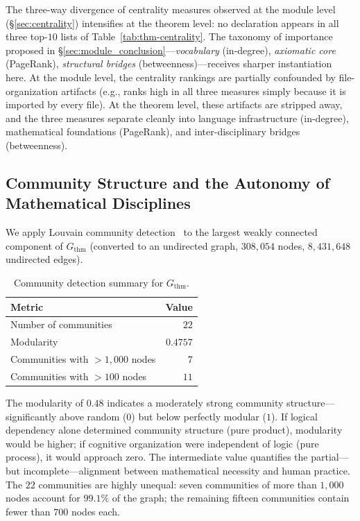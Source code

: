 \begin{remark}
\label{rem:thm-centrality-vs-module}
The three-way divergence of centrality measures observed at the module level (\S\ref{sec:centrality}) intensifies at the theorem level: no declaration appears in all three top-$10$ lists of Table~\ref{tab:thm-centrality}. The taxonomy of importance proposed in \S\ref{sec:module_conclusion}---\emph{vocabulary} (in-degree), \emph{axiomatic core} (PageRank), \emph{structural bridges} (betweenness)---receives sharper instantiation here. At the module level, the centrality rankings are partially confounded by file-organization artifacts (e.g.,  ranks high in all three measures simply because it is imported by every file). At the theorem level, these artifacts are stripped away, and the three measures separate cleanly into language infrastructure (in-degree), mathematical foundations (PageRank), and inter-disciplinary bridges (betweenness).
\end{remark}

\subsection{Community Structure and the Autonomy of Mathematical Disciplines}
\label{sec:thm-community}

We apply Louvain community detection~\cite{blondel2008} to the largest weakly connected component of $G_{\mathrm{thm}}$ (converted to an undirected graph, $308{,}054$ nodes, $8{,}431{,}648$ undirected edges).

\begin{table}[ht]
\centering
\caption{Community detection summary for $G_{\mathrm{thm}}$.}
\label{tab:thm-community-summary}
\begin{tabular}{lr}
\toprule
Metric & Value \\
\midrule
Number of communities & $22$ \\
Modularity & $0.4757$ \\
Communities with ${>}1{,}000$ nodes & $7$ \\
Communities with ${>}100$ nodes & $11$ \\
\bottomrule
\end{tabular}
\end{table}

The modularity of $0.48$ indicates a moderately strong community structure---significantly above random ($0$) but below perfectly modular ($1$). If logical dependency alone determined community structure (pure product), modularity would be higher; if cognitive organization were independent of logic (pure process), it would approach zero. The intermediate value quantifies the partial---but incomplete---alignment between mathematical necessity and human practice. The $22$ communities are highly unequal: seven communities of more than $1{,}000$ nodes account for $99.1\%$ of the graph; the remaining fifteen communities contain fewer than $700$ nodes each.

